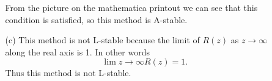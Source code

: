 \documentclass[11pt, oneside, titlepage]{article}
\begin{document}
\begin{enumerate}
\begin{enumerate}
                From the picture on the mathematica printout we can see that this
                condition is satisfied, so this method is A-stable.

            \item[(c)]
                This method is not L-stable because the limit of $R(z)$ as
                $z \to \infty$ along the real axis is 1.
                In other words
                \[
                    \lim{z \to \infty}{R(z)} = 1.
                \]
                Thus this method is not L-stable.
        \end{enumerate}
\end{enumerate}
\end{document}

